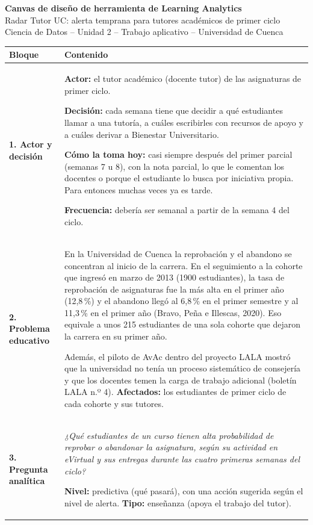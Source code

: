 \documentclass[10pt]{article}
\begin{document}
\begin{center}
{\Large\bfseries Canvas de diseño de herramienta de Learning Analytics}\\[2pt]
{\large Radar Tutor UC: alerta temprana para tutores académicos de primer ciclo}\\[2pt]
Ciencia de Datos -- Unidad 2 -- Trabajo aplicativo -- Universidad de Cuenca
\end{center}

{\small
\begin{longtable}{P{3.3cm} P{22.3cm}}
\toprule
\textbf{Bloque} & \textbf{Contenido}\\
\midrule
\endhead
\bottomrule
\endfoot

\textbf{1. Actor y decisión}
& \textbf{Actor:} el tutor académico (docente tutor) de las asignaturas de primer ciclo.\par
\textbf{Decisión:} cada semana tiene que decidir a qué estudiantes llamar a una tutoría, a cuáles escribirles con recursos de apoyo y a cuáles derivar a Bienestar Universitario.\par
\textbf{Cómo la toma hoy:} casi siempre después del primer parcial (semanas 7 u 8), con la nota parcial, lo que le comentan los docentes o porque el estudiante lo busca por iniciativa propia. Para entonces muchas veces ya es tarde.\par
\textbf{Frecuencia:} debería ser semanal a partir de la semana 4 del ciclo.\\
\midrule

\textbf{2. Problema educativo}
& En la Universidad de Cuenca la reprobación y el abandono se concentran al inicio de la carrera. En el seguimiento a la cohorte que ingresó en marzo de 2013 (1900 estudiantes), la tasa de reprobación de asignaturas fue la más alta en el primer año (12,8\,\%) y el abandono llegó al 6,8\,\% en el primer semestre y al 11,3\,\% en el primer año (Bravo, Peña e Illescas, 2020). Eso equivale a unos 215 estudiantes de una sola cohorte que dejaron la carrera en su primer año.\par
Además, el piloto de AvAc dentro del proyecto LALA mostró que la universidad no tenía un proceso sistemático de consejería y que los docentes temen la carga de trabajo adicional (boletín LALA n.º 4). \textbf{Afectados:} los estudiantes de primer ciclo de cada cohorte y sus tutores.\\
\midrule

\textbf{3. Pregunta analítica}
& \emph{¿Qué estudiantes de un curso tienen alta probabilidad de reprobar o abandonar la asignatura, según su actividad en eVirtual y sus entregas durante las cuatro primeras semanas del ciclo?}\par
\textbf{Nivel:} predictiva (qué pasará), con una acción sugerida según el nivel de alerta. \textbf{Tipo:} enseñanza (apoya el trabajo del tutor).\\
\midrule


\end{longtable}}
\end{document}

